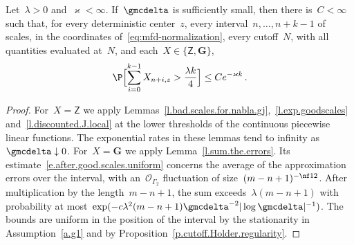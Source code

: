 \documentclass[11pt]{amsart}
\begin{document}
\begin{lemma}
\label{mfd:in-prefix}
Let~$\lambda>0$ and~$\varkappa<\infty$. If~$\gmcdelta$ is sufficiently small, then there is~$C<\infty$ such that, for every deterministic center~$z$, every interval~$n,\ldots,n+k-1$ of scales, in the coordinates of~\eqref{eq:mfd-normalization}, every cutoff~$N$, with all quantities evaluated at~$N$, and each~$X\in\{\mathsf Z,\mathbf G\}$,
\begin{equation*}
	\P\Bigl[\sum_{i=0}^{k-1}X_{n+i,z}>\frac{\lambda k}{4}\Bigr]\leq Ce^{-\varkappa k}\,.
\end{equation*}
\end{lemma}

\begin{proof}
For~$X=\mathsf Z$ we apply Lemmas~\ref{l.bad.scales.for.nabla.gj},~\ref{l.exp.goodscales} and~\ref{l.discounted.J.local} at the lower thresholds of the continuous piecewise linear functions. The exponential rates in these lemmas tend to infinity as~$\gmcdelta\downarrow0$. For~$X=\mathbf G$ we apply Lemma~\ref{l.sum.the.errors}. Its estimate~\eqref{e.after.good.scales.uniform} concerns the average of the approximation errors over the interval, with an~$\mathcal O_{\Gamma_2}$ fluctuation of size~$(m-n+1)^{-\nf12}$. After multiplication by the length~$m-n+1$, the sum exceeds~$\lambda(m-n+1)$ with probability at most~$\exp(-c\lambda^2(m-n+1)\gmcdelta^{-2}|\log\gmcdelta|^{-1})$. The bounds are uniform in the position of the interval by the stationarity in Assumption~\ref{a.g1} and by Proposition~\ref{p.cutoff.Holder.regularity}.
\end{proof}
\end{document}
